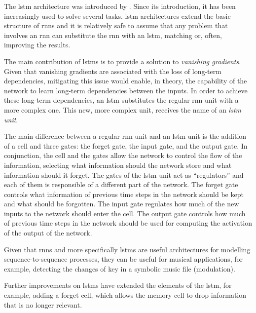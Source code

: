 

The \gls{lstm} architecture was introduced by
\textcite{hochreiter1997long}. Since its introduction, it
has been increasingly used to solve several tasks.
\gls{lstm} architectures extend the basic structure of
\glspl{rnn} and it is relatively safe to assume that any
problem that involves an \gls{rnn} can substitute the
\gls{rnn} with an \gls{lstm}, matching or, often, improving
the results.

The main contribution of \glspl{lstm} is to provide a
solution to \emph{vanishing gradients}. Given that vanishing
gradients are associated with the loss of long-term
dependencies, mitigating this issue would enable, in theory,
the capability of the network to learn long-term
dependencies between the inputs. In order to achieve these
long-term dependencies, an \gls{lstm} substitutes the
regular \gls{rnn} unit with a more complex one. This new,
more complex unit, receives the name of an \emph{\gls{lstm}
unit}.

The main difference between a regular \gls{rnn} unit and an
\gls{lstm} unit is the addition of a cell and three gates:
the forget gate, the input gate, and the output gate. In
conjunction, the cell and the gates allow the network to
control the flow of the information, selecting what
information should the network store and what information
should it forget. The gates of the \gls{lstm} unit act as
``regulators'' and each of them is responsible of a
different part of the network. The forget gate controls what
information of previous time steps in the network should be
kept and what should be forgotten. The input gate regulates
how much of the new inputs to the network should enter the
cell. The output gate controls how much of previous time
steps in the network should be used for computing the
activation of the output of the network.

Given that \glspl{rnn} and more specifically \glspl{lstm}
are useful architectures for modelling sequence-to-sequence
processes, they can be useful for musical applications, for
example, detecting the changes of key in a symbolic music
file (modulation).


Further improvements on \glspl{lstm} have extended the
elements of the \gls{lstm}, for example, adding a forget
cell, which allows the memory cell to drop information that
is no longer relevant.

